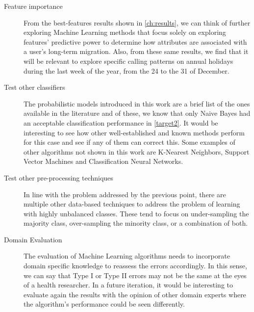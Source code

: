 \begin{description}
    \item [Feature importance] From the best-features results shown in \cref{ch:results}, we can think of further exploring Machine Learning methods that focus solely on exploring features' predictive power to determine how attributes are associated with a user's long-term migration. 
    Also, from these same results, we find that it will be relevant to explore specific calling patterns on annual holidays during the last week of the year, from the 24 to the 31 of December.

    \item [Test other classifiers] The probabilistic models introduced in this work are a brief list of the ones available in the literature and of these, we know that only Naive Bayes had an acceptable classification performance in \cref{target2}.
    It would be interesting to see how other well-established and known methods perform for this case and see if any of them can correct this.
    Some examples of other algorithms not shown in this work are K-Nearest Neighbors, Support Vector Machines and Classification Neural Networks.

    \item [Test other pre-processing techniques] In line with the problem addressed by the previous point, there are multiple other data-based techniques to address the problem of learning with highly unbalanced classes.
    These tend to focus on under-sampling the majority class, over-sampling the minority class, or a combination of both.


    \item [Domain Evaluation] The evaluation of Machine Learning algorithms needs to incorporate domain specific knowledge to reassess the errors accordingly. In this sense, we can say that Type I or Type II errors may not be the same at the eyes of a health researcher.
    In a future iteration, it would be interesting to evaluate again the results with the opinion of other domain experts where the algorithm's performance could be seen differently.

\end{description}

